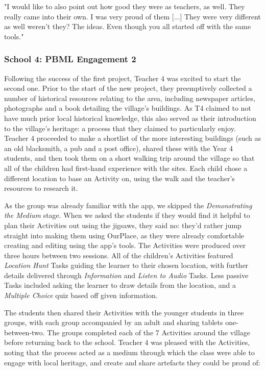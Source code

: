 \begin{displayquote}
"I would like to also point out how good they were as teachers, as well. They really came into their own. I was very proud of them [...] They were very different as well weren't they? The ideas. Even though you all started off with the same tools."
\end{displayquote}

\subsubsection{School 4: PBML Engagement 2}

Following the success of the first project, Teacher 4 was excited to start the second one. Prior to the start of the new project, they preemptively collected a number of historical resources relating to the area, including newspaper articles, photographs and a book detailing the village's buildings. As T4 claimed to not have much prior local historical knowledge, this also served as their introduction to the village's heritage: a process that they claimed to particularly enjoy. Teacher 4 proceeded to make a shortlist of the more interesting buildings (such as an old blacksmith, a pub and a post office), shared these with the Year 4 students, and then took them on a short walking trip around the village so that all of the children had first-hand experience with the sites. Each child chose a different location to base an Activity on, using the walk and the teacher's resources to research it.

As the group was already familiar with the app, we skipped the \textit{Demonstrating the Medium} stage. When we asked the students if they would find it helpful to plan their Activities out using the jigsaws, they said no: they'd rather jump straight into making them using OurPlace, as they were already comfortable creating and editing using the app's tools. The Activities were produced over three hours between two sessions. All of the children's Activities featured \textit{Location Hunt} Tasks guiding the learner to their chosen location, with further details delivered through \textit{Information} and \textit{Listen to Audio} Tasks. Less passive Tasks included asking the learner to draw details from the location, and a \textit{Multiple Choice} quiz based off given information. 

The students then shared their Activities with the younger students in three groups, with each group accompanied by an adult and sharing tablets one-between-two. The groups completed each of the 7 Activities around the village before returning back to the school. Teacher 4 was pleased with the Activities, noting that the process acted as a medium through which the class were able to engage with local heritage, and create and share artefacts they could be proud of:

